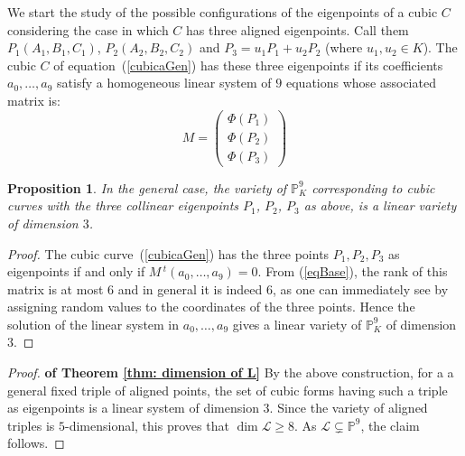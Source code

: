 \documentclass{amsart}
\theoremstyle{plain}
\newtheorem{prop}[theorem]{Proposition}
\theoremstyle{definition}
\newcommand{\p}{\mathbb{P}}
\newcommand{\sL}{\mathcal{L}}
\begin{document}


We start the study of the possible configurations of the eigenpoints of a
cubic $C$ considering the case in which $C$ has three
aligned eigenpoints. Call them
$P_1(A_1, B_1, C_1)$, $P_2(A_2, B_2, C_2)$ and $P_3 = u_1P_1+u_2P_2$
(where $u_1, u_2 \in K$). The cubic $C$
of equation~(\ref{cubicaGen}) has these three eigenpoints if its coefficients
$a_0, \dots, a_9$ satisfy a homogeneous linear system of $9$
equations whose associated matrix is:
\begin{equation}
M = \left(
\begin{array}{c}
  \Phi(P_1) \\
  \Phi(P_2) \\
  \Phi(P_3)
\end{array}
\right)
\label{matriceM}
\end{equation}
\begin{prop} 
  In the general case, the variety of $\mathbb{P}^9_K$ corresponding to
  cubic curves with the three collinear eigenpoints $P_1$, $P_2$, $P_3$
  as above, is a linear variety of dimension $3$. 
\end{prop}
\begin{proof}
The cubic curve~(\ref{cubicaGen}) has the three
points $P_1, P_2, P_3$ as eigenpoints 
if and only if $M\, {}^t\! (a_0, \dots, a_9) = 0$. {From} (\ref{eqBase}),
the rank of this matrix is at most $6$ and in general it is indeed $6$,
as one can immediately see by assigning random values to the coordinates
of the three points. Hence the solution  of the linear system in
$a_0, \dots, a_9$ gives a linear variety of $\mathbb{P}^9_K$ of dimension
$3$.
\end{proof}

\begin{proof} {\bf of Theorem \ref{thm: dimension of L}}
By the above construction, for a a general fixed triple of aligned points, the set of cubic forms having such a triple as eigenpoints is a linear system of dimension $3$. Since the variety of aligned triples is $5$-dimensional, this proves that $\dim \mathcal{L} \ge 8$. As $\sL \subsetneq\p^9$, the claim
follows.
\end{proof}
\end{document}
